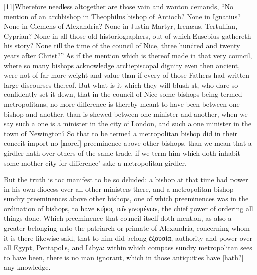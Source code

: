 [11]Wherefore needless altogether are those vain and wanton demands, “No mention of an archbishop in Theophilus bishop of Antioch? None in Ignatius? None in Clemens of Alexandria? None in Justin Martyr, Irenæus, Tertullian, Cyprian? None in all those old historiographers, out of which Eusebius gathereth his story? None till the time of the council of Nice, three hundred and twenty years after Christ?” As if the mention which is thereof made in that very council, where so many bishops acknowledge  archiepiscopal dignity even then ancient, were not of far more weight and value than if every of those Fathers had written large discourses thereof. But what is it which they will blush at, who dare so confidently set it down, that in the council of Nice some bishops being termed metropolitans, no more difference is thereby meant to have been between one bishop and another, than is shewed between one minister and another, when we say such a one is a minister in the city of London, and such a one minister in the town of Newington? So that to be termed a metropolitan bishop did in their conceit import no [moref] preeminence above other bishops, than we mean that a girdler hath over others of the same trade, if we term him which doth inhabit some mother city for difference’ sake a metropolitan girdler.

But the truth is too manifest to be so deluded; a bishop at that time had power in his own diocess over all other ministers there, and a metropolitan bishop sundry preeminences above other bishops, one of which preeminences was in the ordination of bishops, to have κυ̑ρος τω̑ν γινομένων, the chief power of ordering all things done. Which preeminence that council itself doth mention, as also a greater belonging unto the patriarch or primate of Alexandria, concerning whom it is there likewise said, that to him did belong ἐξουσία, authority and power over all Egypt, Pentapolis, and Libya: within which compass sundry metropolitan sees to have been,  there is no man ignorant,
 which in those antiquities have [hath?] any knowledge.

